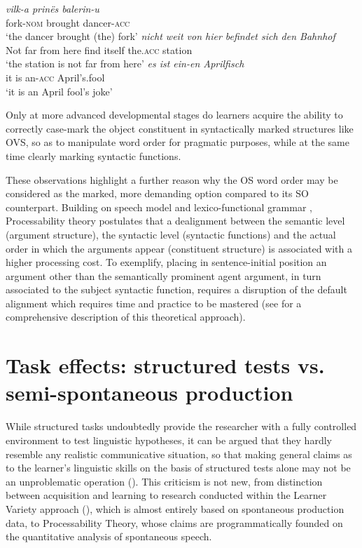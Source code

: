 \ea%
    \label{ex:01:5}
    \ea\label{ex:01:5a}
    \gll    \textit{vilk-a prinës balerin-u}\\
            fork-\textsc{nom}  brought  dancer-\textsc{acc}\\
    \glt    ‘the dancer brought (the) fork’
    \ex\label{ex:01:5b}
    \gll    \textit{nicht weit von hier befindet sich den Bahnhof} \\
            Not far from here  find    itself  the.\textsc{acc}  station\\
    \glt    ‘the station is not far from here’
    \ex\label{ex:01:5c}
    \gll    \textit{es ist ein-en Aprilfisch}\\
            it   is   an-\textsc{acc}   April's.fool\\
    \glt    ‘it is an April fool's joke’
    \z
\z

Only at more advanced developmental stages do learners acquire the ability to correctly case-mark the object constituent in syntactically marked structures like OVS, so as to manipulate word order for pragmatic purposes, while at the same time clearly marking syntactic functions. 

These observations highlight a further reason why the OS word order may be considered as the marked, more demanding option compared to its SO counterpart. Building on  speech model and lexico-functional grammar \citep{Bresnan2001}, Processability theory postulates that a dealignment between the semantic level (argument structure), the syntactic level (syntactic functions) and the actual order in which the arguments appear (constituent structure) is associated with a higher processing cost. To exemplify, placing in sentence-initial position an argument other than the semantically prominent agent argument, in turn associated to the subject syntactic function, requires a disruption of the default alignment which requires time and practice to be mastered (see \citealt{BettoniDi-Biase2015} for a comprehensive description of this theoretical approach).

\section{Task effects: structured tests vs. semi-spontaneous production}\label{sec:01:2}

While structured tasks undoubtedly provide the researcher with a fully controlled environment to test linguistic hypotheses, it can be argued that they hardly resemble any realistic communicative situation, so that making general claims as to the learner’s linguistic skills on the basis of structured tests alone may not be an unproblematic operation (\citealt[289—290]{Ellis1985}). This criticism is not new, from  distinction between acquisition and learning to research conducted within the Learner Variety approach (\citealt{Perdue1993, Perdue1996, Starren2001, Bernini2003, Giacalone-Ramat2003}), which is almost entirely based on spontaneous production data, to Processability Theory, whose claims are programmatically founded on the quantitative analysis of spontaneous speech. 

